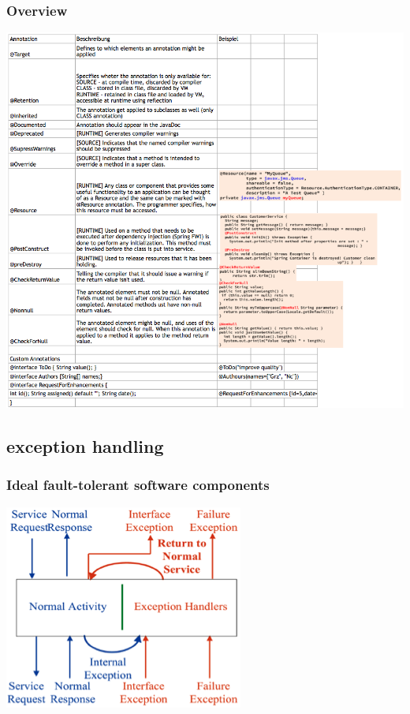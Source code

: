\documentclass[10pt]{article}
\begin{document}
\subsubsection{Overview}
\begin{center}
	\includegraphics[scale=0.55]{annotations.png}
\end{center}
\subsection{exception handling}
\subsubsection{Ideal fault-tolerant software components}
\begin{center}
	\includegraphics[scale=0.6]{fault_tolerant.png}
\end{center}
\end{document}
